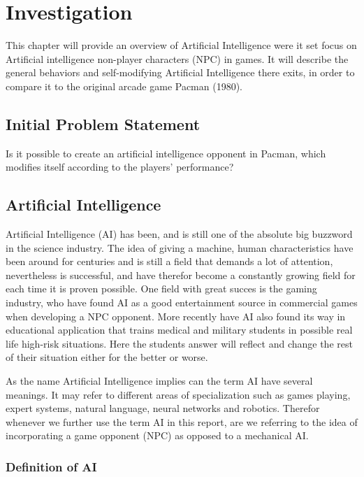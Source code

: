 \section{Investigation} \label{sec:preanalysus}
This chapter will provide an overview of Artificial Intelligence were it set focus on Artificial intelligence non-player characters (NPC) in games. It will describe the general behaviors and self-modifying Artificial Intelligence there exits, in order to compare it to the original arcade game Pacman (1980).


\subsection{Initial Problem Statement} \label{sec:initialproblemstatement}
Is it possible to create an artificial intelligence opponent in Pacman, which modifies itself according to the players' performance?


\subsection{Artificial Intelligence} \label{sec:ai}
Artificial Intelligence (AI) has been, and is still one of the absolute big buzzword in the science industry.
The idea of giving a machine, human characteristics have been around for centuries and is still a field that demands a lot of attention, nevertheless is successful, and have therefor become a constantly growing field for each time it is proven possible.
One field with great succes is the gaming industry, who have found AI as a good entertainment source in commercial games when developing a NPC opponent. More recently have AI also found its way in educational application that trains medical and military students in possible real life high-risk situations. Here the students answer will reflect and change the rest of their situation either for the better or worse.

As the name Artificial Intelligence implies can the term AI have several meanings. It may refer to different areas of specialization such as games playing, expert systems, natural language, neural networks and robotics.
Therefor whenever we further use the term AI in this report, are we referring to the idea of incorporating a game opponent (NPC) as opposed to a mechanical AI.



\subsubsection{Definition of AI}

